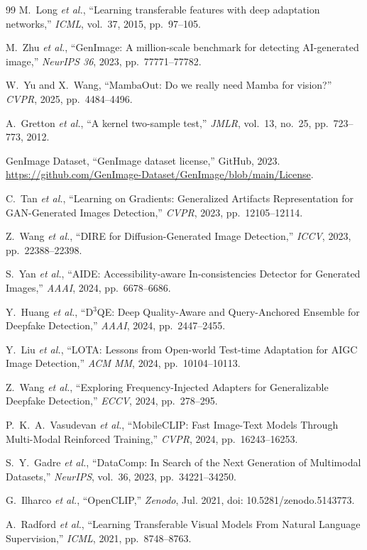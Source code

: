 \documentclass[UTF8, a4paper, 12pt]{ctexart}
\begin{document}
\begin{thebibliography}{99}
M.~Long \textit{et al.}, ``Learning transferable features with deep adaptation networks,'' \textit{ICML}, vol.~37, 2015, pp.~97--105.

M.~Zhu \textit{et al.}, ``GenImage: A million-scale benchmark for detecting AI-generated image,'' \textit{NeurIPS 36}, 2023, pp.~77771--77782.

W.~Yu and X.~Wang, ``MambaOut: Do we really need Mamba for vision?'' \textit{CVPR}, 2025, pp.~4484--4496.

A.~Gretton \textit{et al.}, ``A kernel two-sample test,'' \textit{JMLR}, vol.~13, no.~25, pp.~723--773, 2012.

GenImage Dataset, ``GenImage dataset license,'' GitHub, 2023. \url{https://github.com/GenImage-Dataset/GenImage/blob/main/License}.

C.~Tan \textit{et al.}, ``Learning on Gradients: Generalized Artifacts Representation for GAN-Generated Images Detection,'' \textit{CVPR}, 2023, pp.~12105--12114.

Z.~Wang \textit{et al.}, ``DIRE for Diffusion-Generated Image Detection,'' \textit{ICCV}, 2023, pp.~22388--22398.

S.~Yan \textit{et al.}, ``AIDE: Accessibility-aware In-consistencies Detector for Generated Images,'' \textit{AAAI}, 2024, pp.~6678--6686.

Y.~Huang \textit{et al.}, ``D$^3$QE: Deep Quality-Aware and Query-Anchored Ensemble for Deepfake Detection,'' \textit{AAAI}, 2024, pp.~2447--2455.

Y.~Liu \textit{et al.}, ``LOTA: Lessons from Open-world Test-time Adaptation for AIGC Image Detection,'' \textit{ACM MM}, 2024, pp.~10104--10113.

Z.~Wang \textit{et al.}, ``Exploring Frequency-Injected Adapters for Generalizable Deepfake Detection,'' \textit{ECCV}, 2024, pp.~278--295.

P.~K.~A.~Vasudevan \textit{et al.}, ``MobileCLIP: Fast Image-Text Models Through Multi-Modal Reinforced Training,'' \textit{CVPR}, 2024, pp.~16243--16253.

S.~Y.~Gadre \textit{et al.}, ``DataComp: In Search of the Next Generation of Multimodal Datasets,'' \textit{NeurIPS}, vol.~36, 2023, pp.~34221--34250.

G.~Ilharco \textit{et al.}, ``OpenCLIP,'' \textit{Zenodo}, Jul. 2021, doi: 10.5281/zenodo.5143773.

A.~Radford \textit{et al.}, ``Learning Transferable Visual Models From Natural Language Supervision,'' \textit{ICML}, 2021, pp.~8748--8763.

\end{thebibliography}
\end{document}
